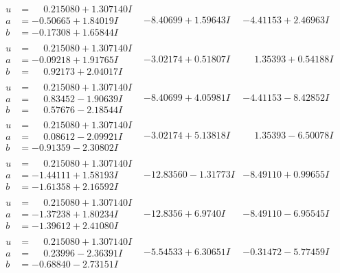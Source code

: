\documentclass[1p]{elsarticle_modified}
\theoremstyle{definition}
\begin{document}
$$\begin{array}{c|c|c}
\begin{aligned}
u &= \phantom{-}0.215080 + 1.307140 I \\
a &= -0.50665 + 1.84019 I \\
b &= -0.17308 + 1.65844 I\end{aligned}
 & -8.40699 + 1.59643 I & -4.41153 + 2.46963 I \\ \hline\begin{aligned}
u &= \phantom{-}0.215080 + 1.307140 I \\
a &= -0.09218 + 1.91765 I \\
b &= \phantom{-}0.92173 + 2.04017 I\end{aligned}
 & -3.02174 + 0.51807 I & \phantom{-}1.35393 + 0.54188 I \\ \hline\begin{aligned}
u &= \phantom{-}0.215080 + 1.307140 I \\
a &= \phantom{-}0.83452 - 1.90639 I \\
b &= \phantom{-}0.57676 - 2.18544 I\end{aligned}
 & -8.40699 + 4.05981 I & -4.41153 - 8.42852 I \\ \hline\begin{aligned}
u &= \phantom{-}0.215080 + 1.307140 I \\
a &= \phantom{-}0.08612 - 2.09921 I \\
b &= -0.91359 - 2.30802 I\end{aligned}
 & -3.02174 + 5.13818 I & \phantom{-}1.35393 - 6.50078 I \\ \hline\begin{aligned}
u &= \phantom{-}0.215080 + 1.307140 I \\
a &= -1.44111 + 1.58193 I \\
b &= -1.61358 + 2.16592 I\end{aligned}
 & -12.83560 - 1.31773 I & -8.49110 + 0.99655 I \\ \hline\begin{aligned}
u &= \phantom{-}0.215080 + 1.307140 I \\
a &= -1.37238 + 1.80234 I \\
b &= -1.39612 + 2.41080 I\end{aligned}
 & -12.8356 + 6.9740 I & -8.49110 - 6.95545 I \\ \hline\begin{aligned}
u &= \phantom{-}0.215080 + 1.307140 I \\
a &= \phantom{-}0.23996 - 2.36391 I \\
b &= -0.68840 - 2.73151 I\end{aligned}
 & -5.54533 + 6.30651 I & -0.31472 - 5.77459 I \\ \hline\begin{aligned}

\end{aligned}
\end{array}$$
\end{document}
